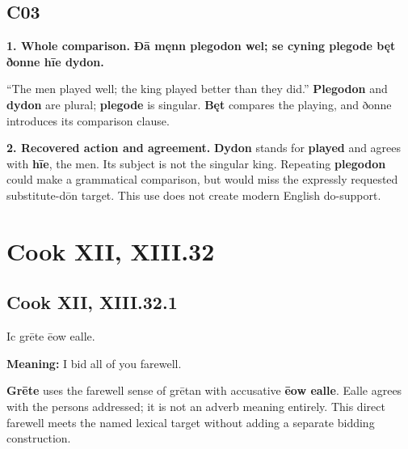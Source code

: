 \subsection*{C03}

\textbf{1. Whole comparison.} \textbf{Ðā męnn plegodon wel; se cyning plegode bęt ðonne hīe dydon.}

“The men played well; the king played better than they did.” \textbf{Plegodon} and \textbf{dydon} are plural; \textbf{plegode} is singular. \textbf{Bęt} compares the playing, and ðonne introduces its comparison clause.

\textbf{2. Recovered action and agreement.} \textbf{Dydon} stands for \textbf{played} and agrees with \textbf{hīe}, the men. Its subject is not the singular king. Repeating \textbf{plegodon} could make a grammatical comparison, but would miss the expressly requested substitute-dōn target. This use does not create modern English do-support.

\clearpage
\section*{Cook XII, XIII.32}

\par\begin{minipage}{\linewidth}\raggedright
\subsection*{Cook XII, XIII.32.1}

Ic grēte ēow ealle.

\textbf{Meaning:} I bid all of you farewell.

\textbf{Grēte} uses the farewell sense of grētan with accusative \textbf{ēow ealle}. Ealle agrees with the persons addressed; it is not an adverb meaning entirely. This direct farewell meets the named lexical target without adding a separate bidding construction.

\end{minipage}\par\addvspace{4pt}

